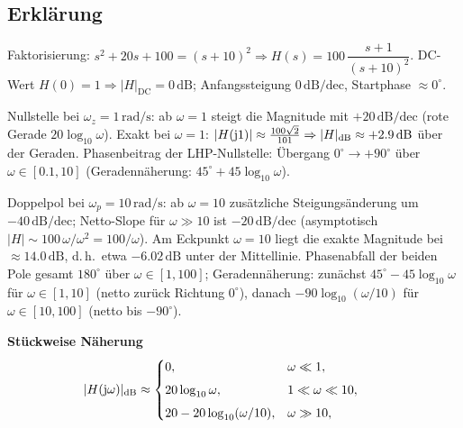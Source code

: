 \begin{center}
\end{center}
\newpage
\subsection{Erklärung}
\vspace{5mm}
\begin{description}[leftmargin=1.2em,labelsep=.6em,font=\bfseries]
\item[Schritt 1] Faktorisierung: $s^2+20s+100=(s+10)^2\Rightarrow H(s)=100\,\dfrac{s+1}{(s+10)^2}$. DC-Wert $H(0)=1\Rightarrow |H|_{\mathrm{DC}}=0\,\mathrm{dB}$; Anfangssteigung $0\,\mathrm{dB/dec}$, Startphase $\approx0^\circ$.
\item[Schritt 2] Nullstelle bei $\omega_z=1\,\mathrm{rad/s}$: ab $\omega=1$ steigt die Magnitude mit $+20\,\mathrm{dB/dec}$ (rote Gerade $20\log_{10}\omega$). Exakt bei $\omega=1$: $|H(\operatorname{j}\!1)|\approx\frac{100\sqrt{2}}{101}\Rightarrow |H|_{\mathrm{dB}}\approx+2.9\,\mathrm{dB}$ über der Geraden. Phasenbeitrag der LHP-Nullstelle: Übergang $0^\circ\to+90^\circ$ über $\omega\in[0.1,10]$ (Geradennäherung: $45^\circ+45\log_{10}\omega$).
\item[Schritt 3] Doppelpol bei $\omega_p=10\,\mathrm{rad/s}$: ab $\omega=10$ zusätzliche Steigungsänderung um $-40\,\mathrm{dB/dec}$; Netto-Slope für $\omega\gg10$ ist $-20\,\mathrm{dB/dec}$ (asymptotisch $|H|\sim100\,\omega/\omega^2=100/\omega$). Am Eckpunkt $\omega=10$ liegt die exakte Magnitude bei $\approx14.0\,\mathrm{dB}$, d.\,h.\ etwa $-6.02\,\mathrm{dB}$ unter der Mittellinie. Phasenabfall der beiden Pole gesamt $180^\circ$ über $\omega\in[1,100]$; Geradennäherung: zunächst $45^\circ-45\log_{10}\omega$ für $\omega\in[1,10]$ (netto zurück Richtung $0^\circ$), danach $-90\log_{10}(\omega/10)$ für $\omega\in[10,100]$ (netto bis $-90^\circ$).
\end{description}

\vspace{0.5cm}
\medskip
\noindent\textbf{Stückweise Näherung}
\[
|H(\operatorname{j}\!\omega)|_{\mathrm{dB}}\approx
\begin{cases}
0,& \omega\ll1,\\[4pt]
20\log_{10}\omega,& 1\ll\omega\ll10,\\[4pt]
20-20\log_{10}(\omega/10),& \omega\gg10,
\end{cases}
\qquad
\]
\newpage